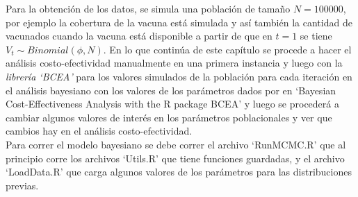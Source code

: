 \documentclass[12pt]{article}
\newcommand{\duda}[1]{\todo[color=green!40]{#1}}
\begin{document}
Para la obtención de los datos, se simula una población de tamaño $N=100000$, por ejemplo la cobertura de la vacuna está simulada y así también la cantidad de vacunados cuando la vacuna está disponible a partir de que en $t=1$ se tiene $V_t \sim Binomial(\phi,N)$. En lo que continúa de este capítulo se procede a hacer el análisis costo-efectividad manualmente en una primera instancia y luego con la \textit{librería `BCEA'}\duda{como citar el paquete} para los valores simulados de la población para cada iteración en el análisis bayesiano con los valores de los parámetros dados por \cite{baio_bayesian_2017} en `Bayesian Cost-Effectiveness Analysis with the R package BCEA' y luego se procederá a cambiar algunos valores de interés en los parámetros poblacionales y ver que cambios hay en el análisis costo-efectividad.\\

Para correr el modelo bayesiano se debe correr el archivo `RunMCMC.R' que al principio corre los archivos `Utils.R' que tiene funciones guardadas, y el archivo `LoadData.R' que carga algunos valores de los parámetros para las distribuciones previas.
\end{document}
